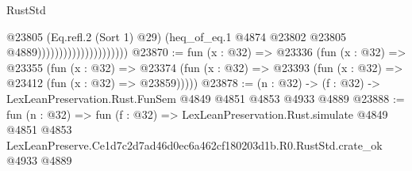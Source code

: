 \begin{lexlean}{RustStd}
\begin{coremodule}
                                            @23805
                                            (Eq.refl.{2} (Sort 1) @29)
                                            (heq_of_eq.{1}
                                              @4874
                                              @23802
                                              @23805
                                              @4889)))))))))))))))))))))
@23870 := fun (x : @32) =>
  @23336
    (fun (x : @32) =>
    @23355
      (fun (x : @32) =>
      @23374 (fun (x : @32) => @23393 (fun (x : @32) => @23412 (fun (x : @32) => @23859)))))
@23878 := (n : @32) -> (f : @32) -> LexLeanPreservation.Rust.FunSem @4849 @4851 @4853 @4933 @4889
@23888 := fun (n : @32) =>
  fun (f : @32) =>
  LexLeanPreservation.Rust.simulate
    @4849
    @4851
    @4853
    LexLeanPreserve.Ce1d7c2d7ad46d0ec6a462cf180203d1b.R0.RustStd.crate_ok
    @4933
    @4889
\end{coremodule}
\end{lexlean}
